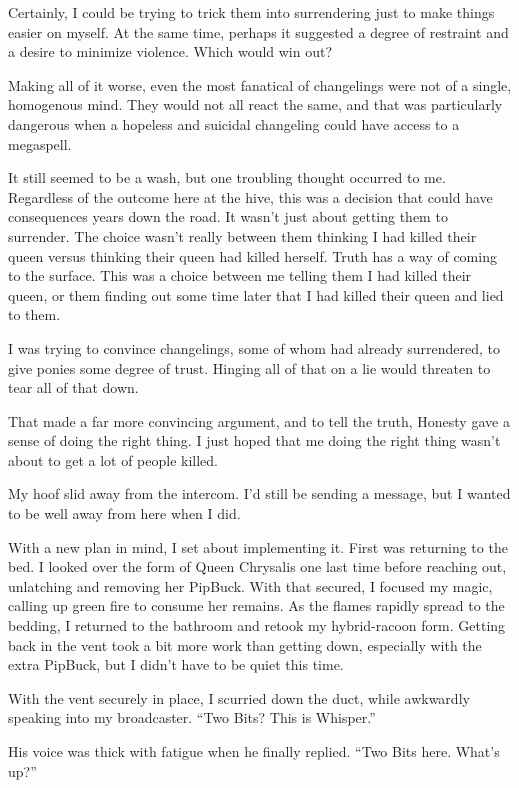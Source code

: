 Certainly, I could be trying to trick them into surrendering just to make things easier on myself. At the same time, perhaps it suggested a degree of restraint and a desire to minimize violence. Which would win out?

Making all of it worse, even the most fanatical of changelings were not of a single, homogenous mind. They would not all react the same, and that was particularly dangerous when a hopeless and suicidal changeling could have access to a megaspell.

It still seemed to be a wash, but one troubling thought occurred to me. Regardless of the outcome here at the hive, this was a decision that could have consequences years down the road. It wasn’t just about getting them to surrender. The choice wasn’t really between them thinking I had killed their queen versus thinking their queen had killed herself. Truth has a way of coming to the surface. This was a choice between me telling them I had killed their queen, or them finding out some time later that I had killed their queen and lied to them.

I was trying to convince changelings, some of whom had already surrendered, to give ponies some degree of trust. Hinging all of that on a lie would threaten to tear all of that down.

That made a far more convincing argument, and to tell the truth, Honesty gave a sense of doing the right thing. I just hoped that me doing the right thing wasn’t about to get a lot of people killed.

My hoof slid away from the intercom. I’d still be sending a message, but I wanted to be well away from here when I did.

With a new plan in mind, I set about implementing it. First was returning to the bed. I looked over the form of Queen Chrysalis one last time before reaching out, unlatching and removing her PipBuck. With that secured, I focused my magic, calling up green fire to consume her remains. As the flames rapidly spread to the bedding, I returned to the bathroom and retook my hybrid-racoon form. Getting back in the vent took a bit more work than getting down, especially with the extra PipBuck, but I didn’t have to be quiet this time.

With the vent securely in place, I scurried down the duct, while awkwardly speaking into my broadcaster. “Two Bits? This is Whisper.”

His voice was thick with fatigue when he finally replied. “Two Bits here. What’s up?”

